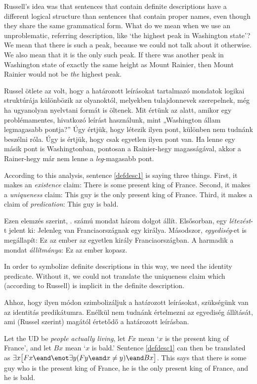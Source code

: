 Russell's idea was that sentences that contain definite descriptions have a different logical structure than sentences that contain proper names, even though they share the same grammatical form. What do we mean when we use an unproblematic, referring description, like `the highest peak in Washington state'? We mean that there is such a peak, because we could not talk about it otherwise. We also mean that it is the only such peak. If there was another peak in Washington state of exactly the same height as Mount Rainier, then Mount Rainier would not be \emph{the} highest peak.

Russel ötlete az volt, hogy a határozott leírásokat tartalmazó mondatok logikai struktúrája különbözik az olyanoktól, melyekben tulajdonnevek szerepelnek, még ha ugyanolyan nyelvtani formát is öltenek. Mit értünk az alatt, amikor egy problémamentes, hivatkozó leírást használunk, mint „Washington állam legmagasabb pontja?” Úgy értjük, hogy létezik ilyen pont, különben nem tudnánk beszélni róla. Úgy is értjük, hogy csak egyetlen ilyen pont van. Ha lenne egy másik pont is Washingtonban, pontosan a Rainier-hegy magasságával, akkor a Rainer-hegy már nem lenne a  \emph{leg}-magasabb pont.

According to this analysis, sentence \ref{defdesc1} is saying three things. First, it makes an \emph{existence} claim: There is some present king of France. Second, it makes a \emph{uniqueness} claim: This guy is the only present king of France. Third, it makes a claim of \emph{predication}: This guy is bald.

Ezen elemzés szerint, . számú mondat három dolgot állít. Elsősorban, egy \emph{létezést}-t jelent ki: Jelenleg van Franciaországnak egy királya. Másodszor, \emph{egyediség}-et is megállapít: Ez az ember az egyetlen király Franciaországban. A harmadik a mondat \emph{állítmánya}: Ez az ember kopasz.

In order to symbolize definite descriptions in this way, we need the identity predicate. Without it, we could not translate the uniqueness claim which (according to Russell) is implicit in the definite description.

Ahhoz, hogy ilyen módon szimbolizáljuk a határozott leírásokat, szükségünk van az identitás predikátumra. Enélkül nem tudnánk értelmezni az egyediség állítását, ami (Russel szerint) magától értetődő a határozott leírásban.

Let the UD be \emph{people actually living}, let $Fx$ mean `$x$ is the present king of France', and let $Bx$ mean `$x$ is bald.' Sentence \ref{defdesc1} can then be translated as $\exists x\bigl[Fx \eand \enot\exists y(Fy \eand x\neq y) \eand Bx\bigr]$. This says that there is some guy who is the present king of France, he is the only present king of France, and he is bald.

